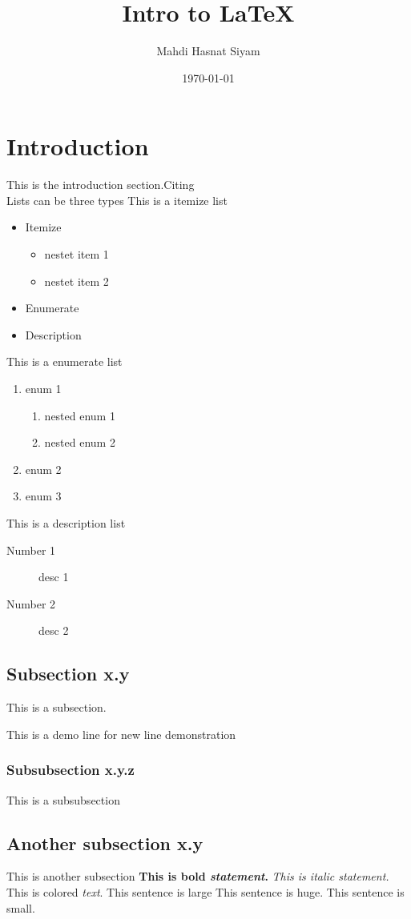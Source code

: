 \documentclass[18pt,a4paper]{article}
\author{Mahdi Hasnat Siyam}
\title{Intro to {\LaTeX}}
\date{\today}
\begin{document}
\maketitle   
\tableofcontents
\pagebreak

\section{Introduction}
This is the introduction section.Citing \cite{adams1995hitchhiker} \\
Lists can be three types
This is a itemize list
\begin{itemize}
    \item Itemize
    \begin{itemize}
        \item nestet item 1
        \item nestet item 2
    \end{itemize}
    \item Enumerate
    \item Description
\end{itemize}
This is a enumerate list
\begin{enumerate}
    \item enum 1
    \begin{enumerate}
        \item nested enum 1
        \item nested enum 2
    \end{enumerate}
    \item enum 2
    \item enum 3
\end{enumerate}
This is a description list
\begin{description}
    \item[Number 1] desc 1
    \item[Number 2] desc 2
\end{description}

\subsection{Subsection x.y}
This is a subsection.
\par
This is a demo line for new line demonstration
\subsubsection{Subsubsection x.y.z}
This is a subsubsection
\subsection{Another subsection x.y}
This is another subsection
\newline
\textbf{This is bold \emph{statement}.}
\newline
\textit{This is italic \emph{statement}.}
\newline
{\color{red} This is colored \emph{text}.}
\newline
\large{This sentence is large}
\newline
\huge{This sentence is huge.}
\newline
\small{This sentence is small.}
\end{document}
